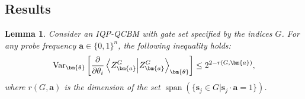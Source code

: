 \documentclass[a4paper,onecolumn,notitlepage,nofootinbib,longbibliography,superscriptaddress, floatfix, pra, aps, 10pt]{revtex4-2}
\newcommand{\cmt}[1]{{\color{blue}[#1]}}
\newcommand{\vttheta}{{\bm{\theta}}}
\newcommand{\vta}{{\bm{a}}}
\newcommand{\vtsj}{{\bm{s}_j}}
\newtheorem{lemma}{Lemma}
\begin{document}
\subsection{Results}
\begin{lemma}
\label{lemma: derivation}
Consider an IQP-QCBM with gate set specified by the indices $G$. For any probe frequency $\vta \in \{0,1\}^n$, the following inequality holds: \begin{equation}\operatorname{Var}_\vttheta \left[\frac{\partial}{\partial \theta_i} \braket{Z^G_\vta}_\vttheta \right] \leq 2^{2-r(G,\vta)}, \end{equation}
where $r(G,\vta)$ is the dimension of the set $\operatorname{span}(\{\vtsj \in G|\vtsj \cdot\vta=1\})$.
\end{lemma}
\end{document}
